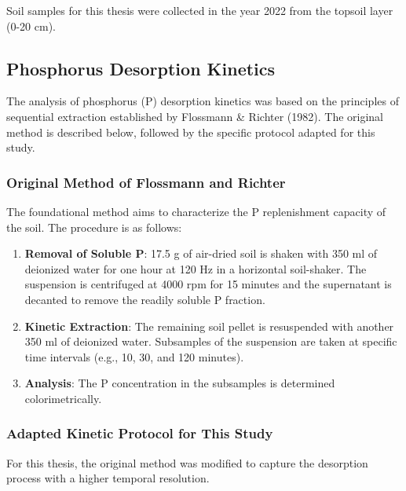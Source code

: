 \documentclass[
  a4paper,
]{article}
\providecommand{\tightlist}{%
  \setlength{\itemsep}{0pt}\setlength{\parskip}{0pt}}
\begin{document}
Soil samples for this thesis were collected in the year 2022 from the
topsoil layer (0-20 cm).

\subsection{Phosphorus Desorption
Kinetics}\label{sec-phosphorus-desorption-kinetics}

The analysis of phosphorus (P) desorption kinetics was based on the
principles of sequential extraction established by Flossmann \& Richter
(1982). The original method is described below, followed by the specific
protocol adapted for this study.

\subsubsection{Original Method of Flossmann and
Richter}\label{original-method-of-flossmann-and-richter}

The foundational method aims to characterize the P replenishment
capacity of the soil. The procedure is as follows:

\begin{enumerate}
\def\labelenumi{\arabic{enumi}.}
\tightlist
\item
  \textbf{Removal of Soluble P}: 17.5 g of air-dried soil is shaken with
  350 ml of deionized water for one hour at 120 Hz in a horizontal
  soil-shaker. The suspension is centrifuged at 4000 rpm for 15 minutes
  and the supernatant is decanted to remove the readily soluble P
  fraction.
\item
  \textbf{Kinetic Extraction}: The remaining soil pellet is resuspended
  with another 350 ml of deionized water. Subsamples of the suspension
  are taken at specific time intervals (e.g., 10, 30, and 120 minutes).
\item
  \textbf{Analysis}: The P concentration in the subsamples is determined
  colorimetrically.
\end{enumerate}

\subsubsection{Adapted Kinetic Protocol for This
Study}\label{sec-adapted-kinetic-protocol-for-this-study}

For this thesis, the original method was modified to capture the
desorption process with a higher temporal resolution.
\end{document}

